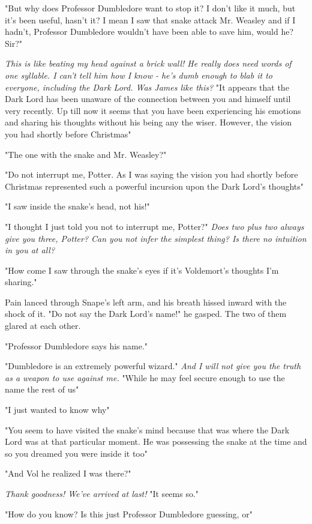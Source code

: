 "But why does Professor Dumbledore want to stop it? I don't like it much, but it's been useful, hasn't it? I mean{\el} I saw that snake attack Mr. Weasley and if I hadn't, Professor Dumbledore wouldn't have been able to save him, would he? Sir?"

\emph{This is like beating my head against a brick wall! He really does need words of one syllable. I can't tell him how I know - he's dumb enough to blab it to everyone, including the Dark Lord. Was James like this?} "It appears that the Dark Lord has been unaware of the connection between you and himself until very recently. Up till now it seems that you have been experiencing his emotions and sharing his thoughts without his being any the wiser. However, the vision you had shortly before Christmas{\el}"

"The one with the snake and Mr. Weasley?"

"Do not interrupt me, Potter. As I was saying{\el} the vision you had shortly before Christmas represented such a powerful incursion upon the Dark Lord's thoughts{\el}"

"I saw inside the snake's head, not his!"

"I thought I just told you not to interrupt me, Potter?" \emph{Does two plus two always give you three, Potter? Can you not infer the simplest thing? Is there no intuition in you at all?}

"How come I saw through the snake's eyes if it's Voldemort's thoughts I'm sharing."

Pain lanced through Snape's left arm, and his breath hissed inward with the shock of it. "Do not say the Dark Lord's name!" he gasped. The two of them glared at each other.

"Professor Dumbledore says his name."

"Dumbledore is an extremely powerful wizard." \emph{And I will not give you the truth as a weapon to use against me.} "While he may feel secure enough to use the name{\el} the rest of us{\el}"

"I just wanted to know why{\el}"

"You seem to have visited the snake's mind because that was where the Dark Lord was at that particular moment. He was possessing the snake at the time and so you dreamed you were inside it too{\el}"

"And Vol{\el} he{\el} realized I was there?"

\emph{Thank goodness! We've arrived at last!} "It seems so."

"How do you know? Is this just Professor Dumbledore guessing, or{\el}"

